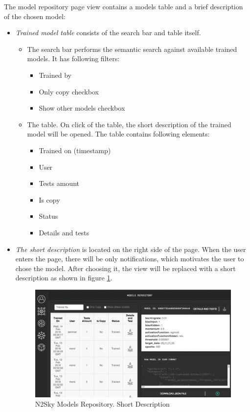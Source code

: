 The model repository page view contains a models table and a brief description of the chosen model:
\begin{itemize}
\item \emph{Trained model table} consists of the search bar and table itself.
\begin{itemize}
\item The search bar performs the semantic search against available trained models. It has following filters:
\begin{itemize}
\item Trained by
\item Only copy checkbox
\item Show other models checkbox
\end{itemize}
\item The table. On click of the table, the short description of the trained model will be opened. The table contains following elements:
\begin{itemize}
\item Trained on (timestamp)
\item User
\item Tests amount
\item Is copy
\item Status
\item Details and tests
\end{itemize}
\end{itemize}

\item \emph{The short description} is located on the right side of the page. When the user enters the page, there will be only notifications, which motivates the user to chose the model. After choosing it, the view will be replaced with a short description as shown in figure \ref{fig:short_desc}.

\begin{figure}[H]
\begin{center}
  \includegraphics[width=\linewidth]{components/5/img/short_desc.png}
  \caption{N2Sky Models Repository. Short Description}
  \label{fig:short_desc}
\end{center}
\end{figure} 


\end{itemize}
